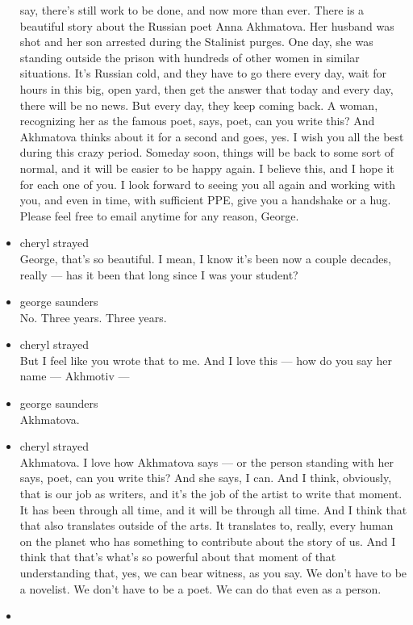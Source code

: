 \begin{itemize}
  say, there's still work to be done, and now more than ever. There is a
  beautiful story about the Russian poet Anna Akhmatova. Her husband was
  shot and her son arrested during the Stalinist purges. One day, she
  was standing outside the prison with hundreds of other women in
  similar situations. It's Russian cold, and they have to go there every
  day, wait for hours in this big, open yard, then get the answer that
  today and every day, there will be no news. But every day, they keep
  coming back. A woman, recognizing her as the famous poet, says, poet,
  can you write this? And Akhmatova thinks about it for a second and
  goes, yes. I wish you all the best during this crazy period. Someday
  soon, things will be back to some sort of normal, and it will be
  easier to be happy again. I believe this, and I hope it for each one
  of you. I look forward to seeing you all again and working with you,
  and even in time, with sufficient PPE, give you a handshake or a hug.
  Please feel free to email anytime for any reason, George.
\item
  cheryl strayed\\
  George, that's so beautiful. I mean, I know it's been now a couple
  decades, really --- has it been that long since I was your student?
\item
  george saunders\\
  No. Three years. Three years.
\item
  cheryl strayed\\
  But I feel like you wrote that to me. And I love this --- how do you
  say her name --- Akhmotiv ---
\item
  george saunders\\
  Akhmatova.
\item
  cheryl strayed\\
  Akhmatova. I love how Akhmatova says --- or the person standing with
  her says, poet, can you write this? And she says, I can. And I think,
  obviously, that is our job as writers, and it's the job of the artist
  to write that moment. It has been through all time, and it will be
  through all time. And I think that that also translates outside of the
  arts. It translates to, really, every human on the planet who has
  something to contribute about the story of us. And I think that that's
  what's so powerful about that moment of that understanding that, yes,
  we can bear witness, as you say. We don't have to be a novelist. We
  don't have to be a poet. We can do that even as a person.
\item

\end{itemize}
